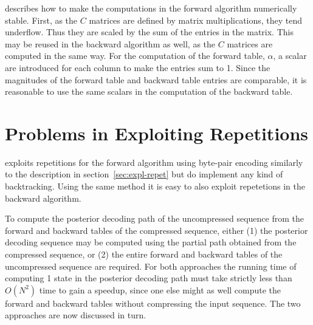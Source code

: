 \citet{sand2013ziphmmlib} describes how to make the computations in the forward
algorithm numerically stable. First, as the $C$ matrices are defined by matrix
multiplications, they tend underflow. Thus they are scaled by the sum of the
entries in the matrix. This may be reused in the backward algorithm as well, as
the $C$ matrices are computed in the same way. For the computation of the
forward table, $\alpha$, a scalar are introduced for each column to make the
entries sum to 1. Since the magnitudes of the forward table and backward table
entries are comparable, it is reasonable to use the same scalars in the
computation of the backward table.


\section{Problems in Exploiting Repetitions}
\label{sec:probl-expl-repet}

\citet{sand2013ziphmmlib} exploits repetitions for the forward algorithm using
byte-pair encoding similarly to the description in
section~\ref{sec:expl-repet} but do implement any kind of backtracking. Using
the same method it is easy to also exploit repetetions in the backward
algorithm.

To compute the posterior decoding path of the uncompressed sequence from the
forward and backward tables of the compressed sequence, either (1) the
posterior decoding sequence may be computed using the partial path obtained
from the compressed sequence, or (2) the entire forward and backward tables of
the uncompressed sequence are required. For both approaches the running time of
computing 1 state in the posterior decoding path must take strictly less than
$O(N^2)$ time to gain a speedup, since one else might as well compute the
forward and backward tables without compressing the input sequence. The two
approaches are now discussed in turn.

